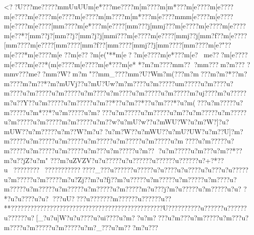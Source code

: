 {{{{{{{{{{{{{{{{{{{{{{{{{{{{{{{{{{{{{{{{{{{{{{{{{{{{{{{{{{{{{{{{{{{{{{{{{{{{{{{{{{{{{{{{{{{{{{{{{{{{{{{{{{{{{{{{{{{{{{{{{{{{{{{{{{{{{{{{{{{{{{{{{{{{{{{{{{{{{{{{{{{{{{{{{{{{{{{{{{{{{{{{{{{{{{{{{{{{{{{{{{{{{{{{{{{{{{{{{{{{{{{{{{{{{{{{{{{{{{{{{{{{{{{{{{{{{{{{{{{{{{{{{{{{{{{{{{{{{{{{{{{{{{{{{{{{{{{{{{{{{{{{{{{{{{{{{{{{{{{{{{{{{{{{{{{{{{{{{{{{{{{{{{{{{{{{{{{{{{{{{{{{{{{{{{{{{{{{{{{{{{{{{{{{{{{{{{{{{{{{{{{{{{{{{{{{{{{{{{{{{{{{{{{{{{{{{{{{{{{{{{{{{{{{{{{{{{{{{{{{{{{{{{{{{{{{{{{{{{{{{{{{{{{{{{{{{{{{{{{{{{{{{{{{{{{{{{{{{{{{{{{{{{{{{{{{{{{{{{{{{{{{{{{{{{{{{{{{{{{{{{{{{{{{{{{{{{{{{{{{{{{{{{{{{{{{{{{{{{{{{{{{{{{{{{{{{{{{{{{{{{{{{{{{{{{{{{{{{{{{{{{{{{{{{{{{{{{{{{{{{{{{{{{{{{{{{{{{{{{{{{{{{{{{{{{{{{{{{{{{{{{{{{{{{{{{{{{{{{{{{{{{{{{{{{{{{{{{{{{{{{{{{{{{{{{{{{{{{{{{{{{{{{{{{{{{{{{{{{{{{{{{{{{{{{{{{{{{{{{{{{{{{{{{{{{{{{{{{{{{{{{{{{{{<??U???{m{e?????m{mUuUU{m[e*???{m{e????{m[m????{m[m*???{m[e????{m[e????{m[e????{m[e????{m[e????{m[e????{m[m????{m[m*???{m[e????{m{m    {m[e????{m[e????{m[e????{m[e????[m{m????{m[e*???{m[e????[m{m???j[m{mj???{m[e????{m[e????{m[e????{m[e??*?[m{m??j?[m{m??j?[m{m?j?j[m{mi???{m[e????{m[e????[m{mj??j[m{m?f??{m[e????[m{m????{m[e????[m{m????[m{m?f??[m{m????[m{mj??j[m{m????[m{m????{m[e?"??{m[e???*{m[e????{m[e 
??{m[e???{m[e("**{m[e??{m[e????{m[e*???{m[e?{m{e???{m[e????{m[e????{m[e??*({m[e????{m[e????{m[e*???{m[e*
*?{m?m????{m{m???m{m???{m?m???
?m{mv???{m{e ? ?m{m?W?{m?m "??m{m_????m{m?U?W{m?m(???{m?m???{m?m?*??{m?m????{m?m??*?{m?mUVj??u?mU?Uw?m?m????{u?m?????u{m?????u?m????u?m????u?m?????u?m?????u?m????u?m????u?m?????u?m?????m?uj????m?u?????m?u??Y??u?m?????u?m?????u?m??*??u?m??*??u?m???*?u?m(???u?m?????u?m?????u?m*??*?u?m?????u?m????u?m?????u?m?????u?m??u?m?????u?m?????u?m?????u?m?????m?m?????u?m??w?u?mU?w??u?mWU?W?u?m?W?]?u?mUW??u?m?????u?m}??W?m?u  ??u?m?W??u?m}WU??u?mU?UW?u?m??U]?m?m?????u?m?????u?m?????u?m?????u?m?????u?m?????u?m????u?m?????u?m?????u?m?????u?m?????u?m???u?m?????u?m??
?u?m?????u?m???u?m??*??m?u??jZ?u?m"
???m?uZVZV?u?u?????u?u?????}?u?????}?u?????}?u?+?*?}?u  ??}??????~???????}??????}??_??}?u?????}?u?????u?u????u?u????u?u???u?u?????u?m?????u?m?????m?u?Zj??m?u?fj??m?u?????u?m?????u?m?????u?m????u?m?????u?m?????u?m?????u?m?????u?m?????m?u???j?m?u?????u?m?????u?u?
?*?u?u?? ??u?u? ??}?uU???}?u???????m?????}?u?????}?u??**?}?}?????}?}?????}?}??????}???????}???????}???????}?????}?}}U???}?}?????}?u?????}?u?????}?u?????}?u?[_?u?u}}]W?u?u????u?ui????u?m  ??u?m????u?m???u?m?????u?m???u?m????u?m?????u?m?????u?m?_???u?m}???m?u???
}}}}}}}}}}}}}}}}}}}}}}}}}}}}}}}}}}}}}}}}}}}}}}}}}}}}}}}}}}}}}}}}}}}}}}}}}}}}}}}}}}}}}}}}}}}}}}}}}}}}}}}}}}}}}}}}}}}}}}}}}}}}}}}}}}}}}}}}}}}}}}}}}}}}}}}}}}}}}}}}}}}}}}}}}}}}}}}}}}}}}}}}}}}}}}}}}}}}}}}}}}}}}}}}}}}}}}}}}}}}}}}}}}}}}}}}}}}}}}}}}}}}}}}}}}}}}}}}}}}}}}}}}}}}}}}}}}}}}}}}}}}}}}}}}}}}}}}}}}}}}}}}}}}}}}}}}}}}}}}}}}}}}}}}}}}}}}}}}}}}}}}}}}}}}}}}}}}}}}}}}}}}}}}}}}}}}}}}}}}}}}}}}}}}}}}}}}}}}}}}}}}}}}}}}}}}}}}}}}}}}}}}}}}}}}}}}}}}}}}}}}}}}}}}}}}}}}}}}}}}}}}}}}}}}}}}}}}}}}}}}}}}}}}}}}}}}}}}}}}}}}}}}}}}}}}}}}}}}}}}}}}}}}}}}}}}}}}}}}}}}}}}}}}}}}}}}}}}}}}}}}}}}}}}}}}}}}}}}}}}}}}}}}}}}}}}}}}}}}}}}}}}}}}}}}}}}}}}}}}}}}}}}}}}}}}}}}}}}}}}}}}}}}}}}}}}}}}}}}}}}}}}}}}}}}}}}}}}}}}}}}}}}}}}}}}}}}}}}}}}}}}}}}}}}}}}}}}}}}}}}}}}}}}}}}}}}}}}}}}}}}}}}}}}}}}}}}}}}}}}}}}}}}}}}}}}}}}}}}}}}}}}}}}}}}}}}}}}}}}}}}}}}}}}}}}}}}}}}}}}}}}}}}}}}}}}}}}}}}}}}}}}}}}}}}}}}}}}}}}}}}}}}}}}}}}}}}}}}}}
